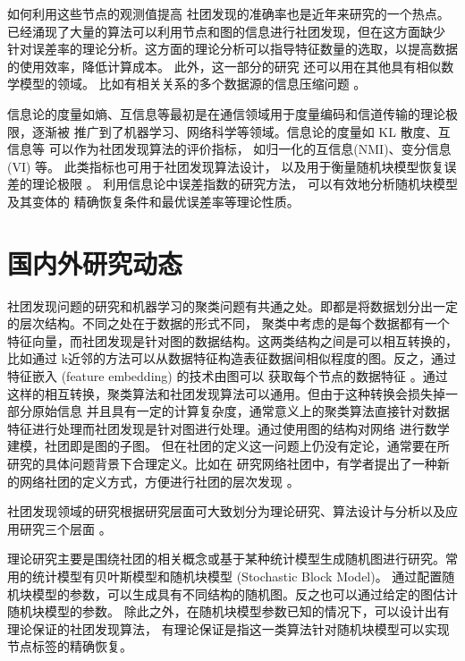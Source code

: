 如何利用这些节点的观测值提高
社团发现的准确率也是近年来研究的一个热点。已经涌现了大量的算法可以利用节点和图的信息进行社团发现，但在这方面缺少
针对误差率的理论分析。这方面的理论分析可以指导特征数量的选取，以提高数据的使用效率，降低计算成本。
此外，这一部分的研究
还可以用在其他具有相似数学模型的领域。
比如有相关关系的多个数据源的信息压缩问题
\cite{abbe17sideinfo}。

信息论的度量如熵、互信息等最初是在通信领域用于度量编码和信道传输的理论极限，逐渐被
推广到了机器学习、网络科学等领域。信息论的度量如 KL 散度、互信息等 可以作为社团发现算法的评价指标，
如归一化的互信息(NMI)\cite{Danon_2005}、变分信息(VI) \cite{2007Comparing}等。
此类指标也可用于社团发现算法设计\cite{ic2002, mim, app12094203}，
以及用于衡量随机块模型恢复误差的理论极限 \cite{abbe2015community, zhang2016}。
利用信息论中误差指数的研究方法，
可以有效地分析随机块模型及其变体的
精确恢复条件和最优误差率等理论性质。


\section{国内外研究动态}
社团发现问题的研究和机器学习的聚类问题有共通之处。即都是将数据划分出一定的层次结构。不同之处在于数据的形式不同，
聚类中考虑的是每个数据都有一个特征向量，而社团发现是针对图的数据结构。这两类结构之间是可以相互转换的，比如通过
k近邻的方法可以从数据特征构造表征数据间相似程度的图。反之，通过特征嵌入 (feature embedding) 的技术由图可以
获取每个节点的数据特征 \cite{hamilton2017representation}。通过这样的相互转换，聚类算法和社团发现算法可以通用。但由于这种转换会损失掉一部分原始信息
并且具有一定的计算复杂度，通常意义上的聚类算法直接针对数据特征进行处理而社团发现是针对图进行处理。通过使用图的结构对网络
进行数学建模，社团即是图的子图。
但在社团的定义这一问题上仍没有定论，通常要在所研究的具体问题背景下合理定义。比如在
研究网络社团中，有学者提出了一种新的网络社团的定义方式，方便进行社团的层次发现
\cite{alphabetaclustering2019}。

社团发现领域的研究根据研究层面可大致划分为理论研究、算法设计与分析以及应用研究三个层面
\cite{ZJSH201102017}。

理论研究主要是围绕社团的相关概念或基于某种统计模型生成随机图进行研究。常用的统计模型有贝叶斯模型和随机块模型 (Stochastic Block Model)。
通过配置随机块模型的参数，可以生成具有不同结构的随机图。反之也可以通过给定的图估计随机块模型的参数\cite{RJXB201609005}。
除此之外，在随机块模型参数已知的情况下，可以设计出有理论保证的社团发现算法，
有理论保证是指这一类算法针对随机块模型可以实现节点标签的精确恢复。

